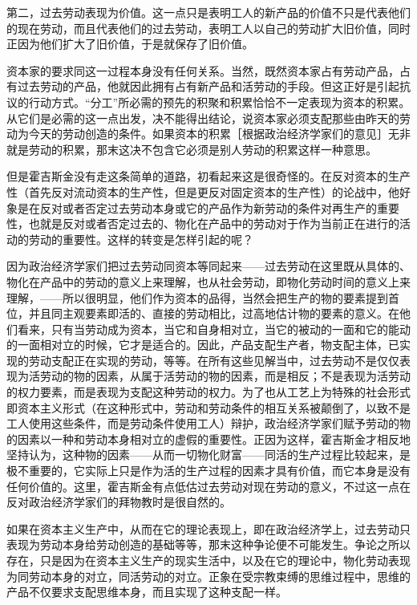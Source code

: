 第二，过去劳动表现为价值。这一点只是表明工人的新产品的价值不只是代表他们的现在劳动，而且代表他们的过去劳动，表明工人以自己的劳动扩大旧价值，同时正因为他们扩大了旧价值，于是就保存了旧价值。

资本家的要求同这一过程本身没有任何关系。当然，既然资本家占有劳动产品，占有过去劳动的产品，他就因此拥有占有新产品和活劳动的手段。但这正好是引起抗议的行动方式。“分工”所必需的预先的积聚和积累恰恰不一定表现为资本的积累。从它们是必需的这一点出发，决不能得出结论，说资本家必须支配那些由昨天的劳动为今天的劳动创造的条件。如果资本的积累［根据政治经济学家们的意见］无非就是劳动的积累，那末这决不包含它必须是别人劳动的积累这样一种意思。

但是霍吉斯金没有走这条简单的道路，初看起来这是很奇怪的。在反对资本的生产性（首先反对流动资本的生产性，但是更反对固定资本的生产性）的论战中，他好象是在反对或者否定过去劳动本身或它的产品作为新劳动的条件对再生产的重要性，也就是反对或者否定过去的、物化在产品中的劳动对于作为当前正在进行的活动的劳动的重要性。这样的转变是怎样引起的呢？

因为政治经济学家们把过去劳动同资本等同起来——过去劳动在这里既从具体的、物化在产品中的劳动的意义上来理解，也从社会劳动，即物化劳动时间的意义上来理解，——所以很明显，他们作为资本的品得，当然会把生产的物的要素提到首位，并且同主观要素即活的、直接的劳动相比，过高地估计物的要素的意义。在他们看来，只有当劳动成为资本，当它和自身相对立，当它的被动的一面和它的能动的一面相对立的时候，它才是适合的。因此，产品支配生产者，物支配主体，已实现的劳动支配正在实现的劳动，等等。在所有这些见解当中，过去劳动不是仅仅表现为活劳动的物的因素，从属于活劳动的物的因素，而是相反；不是表现为活劳动的权力要素，而是表现为支配这种劳动的权力。为了也从工艺上为特殊的社会形式即资本主义形式（在这种形式中，劳动和劳动条件的相互关系被颠倒了，以致不是工人使用这些条件，而是劳动条件使用工人）辩护，政治经济学家们赋予劳动的物的因素以一种和劳动本身相对立的虚假的重要性。正因为这样，霍吉斯金才相反地坚持认为，这种物的因素——从而一切物化财富——同活的生产过程比较起来，是极不重要的，它实际上只是作为活的生产过程的因素才具有价值，而它本身是没有任何价值的。这里，霍吉斯金有点低估过去劳动对现在劳动的意义，不过这一点在反对政治经济学家们的拜物教时是很自然的。

如果在资本主义生产中，从而在它的理论表现上，即在政治经济学上，过去劳动只表现为劳动本身给劳动创造的基础等等，那末这种争论便不可能发生。争论之所以存在，只是因为在资本主义生产的现实生活中，以及在它的理论中，物化劳动表现为同劳动本身的对立，同活劳动的对立。正象在受宗教束缚的思维过程中，思维的产品不仅要求支配思维本身，而且实现了这种支配一样。

